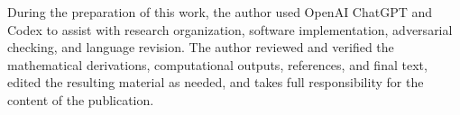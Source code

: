 \documentclass[preprint,12pt,authoryear]{elsarticle}
\begin{document}
During the preparation of this work, the author used OpenAI ChatGPT and
Codex to assist with research organization, software implementation,
adversarial checking, and language revision. The author reviewed and
verified the mathematical derivations, computational outputs,
references, and final text, edited the resulting material as needed,
and takes full responsibility for the content of the publication.




\end{document}
